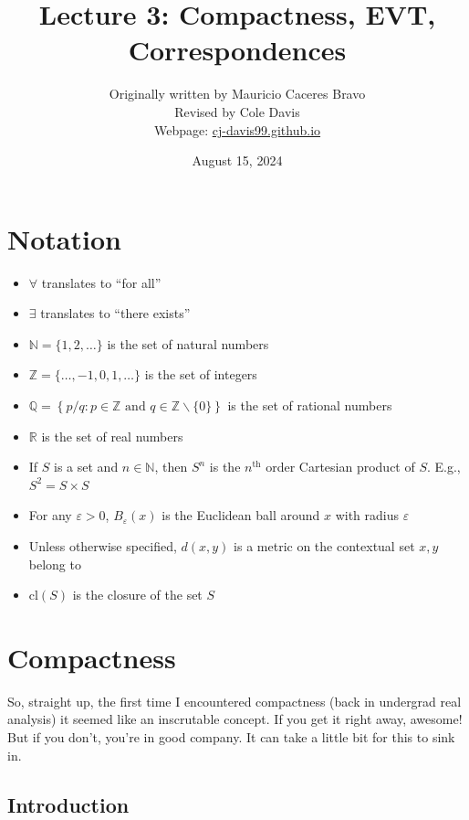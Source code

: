\documentclass{article}
\title{Lecture 3: Compactness, EVT, Correspondences}
\author{Originally written by Mauricio Caceres Bravo\\Revised by Cole Davis\\Webpage: \href{https://cj-davis99.github.io/math-camp.html}{cj-davis99.github.io}}
\date{August 15, 2024}
\newcommand{\cl}{\text{cl}}
\newcommand{\R}{\mathbb{R}}
\newcommand{\N}{\mathbb{N}}
\newcommand{\Q}{\mathbb{Q}}
\newcommand{\Z}{\mathbb{Z}}
\theoremstyle{mythm}
\theoremstyle{mydef}
\begin{document}
\maketitle
\tableofcontents
\newpage
\section*{Notation}
\begin{itemize}
    \item $\forall$ translates to ``for all''
    \item $\exists$ translates to ``there exists''
    \item $\N = \{1,2, \hdots\}$ is the set of natural numbers
    \item $\Z = \{\hdots, -1, 0, 1, \hdots \}$ is the set of integers
    \item $\Q = \left\{ p/q : p \in \Z \text{ and } q \in \Z\backslash\{0\} \right\}$ is the set of rational numbers
    \item $\R$ is the set of real numbers
    \item If $S$ is a set and $n\in \N$, then $S^n$ is the $n^{\text{th}}$ order Cartesian product of $S$. E.g., $S^2 = S \times S$ 
    \item For any $\varepsilon>0$, $B_\varepsilon(x)$ is the Euclidean ball around $x$ with radius $\varepsilon$
    \item Unless otherwise specified, $d(x, y)$ is a metric on the contextual set $x,y$ belong to
    \item $\cl(S)$ is the closure of the set $S$
\end{itemize}
\newpage
\section{Compactness}
\label{sub:compactness}

So, straight up, the first time I encountered compactness (back in undergrad real analysis) it seemed like an inscrutable concept. If you get it right away, awesome! But if you don't, you're in good company. It can take a little bit for this to sink in.

\subsection{Introduction}
\label{ssub:introduction}
\end{document}
